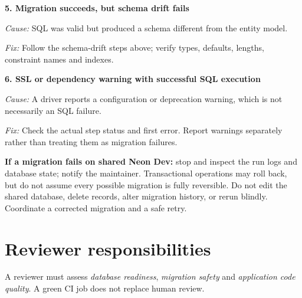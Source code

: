 \documentclass[10pt,a4paper]{article}
\begin{document}
\begin{tcolorbox}[breakable,colback=white,colframe=lightborder,boxrule=.7pt,arc=2mm]
\medskip
\textbf{5. Migration succeeds, but schema drift fails}\par
\textit{Cause:} SQL was valid but produced a schema different from the entity model.\par
\textit{Fix:} Follow the schema-drift steps above; verify types, defaults, lengths, constraint names and indexes.\par
\medskip
\textbf{6. SSL or dependency warning with successful SQL execution}\par
\textit{Cause:} A driver reports a configuration or deprecation warning, which is not necessarily an SQL failure.\par
\textit{Fix:} Check the actual step status and first error. Report warnings separately rather than treating them as migration failures.
\end{tcolorbox}

\begin{tcolorbox}[colback=pale,colframe=lightborder,boxrule=.7pt,arc=2mm]
\textbf{If a migration fails on shared Neon Dev:} stop and inspect the run logs and database state; notify the maintainer. Transactional operations may roll back, but do not assume every possible migration is fully reversible. Do not edit the shared database, delete records, alter migration history, or rerun blindly. Coordinate a corrected migration and a safe retry.
\end{tcolorbox}

\section*{Reviewer responsibilities}
A reviewer must assess \emph{database readiness}, \emph{migration safety} and \emph{application code quality}. A green CI job does not replace human review.
\end{document}

